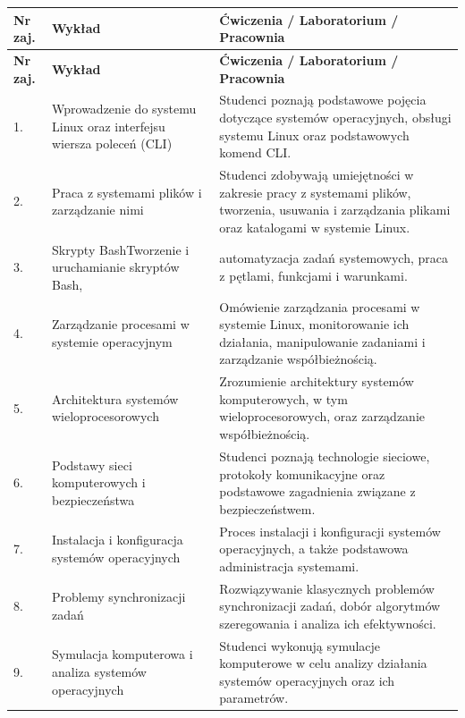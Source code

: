 \documentclass[12pt, a4paper]{article}
\newcommand{\thdrule}{\noalign{\global\setlength{\extrarowheight}{0pt}}}
\newcommand{\thdend}{\noalign{\global\setlength{\extrarowheight}{3pt}}}
\begin{document}
{\scriptsize
\begin{longtable}{m{1.5cm}m{6.5cm}m{6.5cm}}
\thdrule\toprule
\rowcolor{pjatkRed} {\color{white}\textbf{Nr zaj.}} & {\color{white}\textbf{Wykład}} & {\color{white}\textbf{Ćwiczenia / Laboratorium / Pracownia}} \\
\midrule\thdend
\endfirsthead
\thdrule\toprule
\rowcolor{pjatkRed} {\color{white}\textbf{Nr zaj.}} & {\color{white}\textbf{Wykład}} & {\color{white}\textbf{Ćwiczenia / Laboratorium / Pracownia}} \\
\midrule\thdend
\endhead
  \rowcolor{tableRowLight} 1. & Wprowadzenie do systemu Linux oraz interfejsu wiersza poleceń (CLI) & Studenci poznają podstawowe pojęcia dotyczące systemów operacyjnych, obsługi systemu Linux oraz podstawowych komend CLI. \\
  \rowcolor{tableRowAlt} 2. & Praca z systemami plików i zarządzanie nimi & Studenci zdobywają umiejętności w zakresie pracy z systemami plików, tworzenia, usuwania i zarządzania plikami oraz katalogami w systemie Linux. \\
  \rowcolor{tableRowLight} 3. & Skrypty BashTworzenie i uruchamianie skryptów Bash,  & automatyzacja zadań systemowych, praca z pętlami, funkcjami i warunkami. \\
  \rowcolor{tableRowAlt} 4. & Zarządzanie procesami w systemie operacyjnym & Omówienie zarządzania procesami w systemie Linux, monitorowanie ich działania, manipulowanie zadaniami i zarządzanie współbieżnością. \\
  \rowcolor{tableRowLight} 5. & Architektura systemów wieloprocesorowych & Zrozumienie architektury systemów komputerowych, w tym wieloprocesorowych, oraz zarządzanie współbieżnością. \\
  \rowcolor{tableRowAlt} 6. & Podstawy sieci komputerowych i bezpieczeństwa & Studenci poznają technologie sieciowe, protokoły komunikacyjne oraz podstawowe zagadnienia związane z bezpieczeństwem. \\
  \rowcolor{tableRowLight} 7. & Instalacja i konfiguracja systemów operacyjnych & Proces instalacji i konfiguracji systemów operacyjnych, a także podstawowa administracja systemami. \\
  \rowcolor{tableRowAlt} 8. & Problemy synchronizacji zadań & Rozwiązywanie klasycznych problemów synchronizacji zadań, dobór algorytmów szeregowania i analiza ich efektywności. \\
  \rowcolor{tableRowLight} 9. & Symulacja komputerowa i analiza systemów operacyjnych & Studenci wykonują symulacje komputerowe w celu analizy działania systemów operacyjnych oraz ich parametrów. \\
\bottomrule
\end{longtable}}
\end{document}
